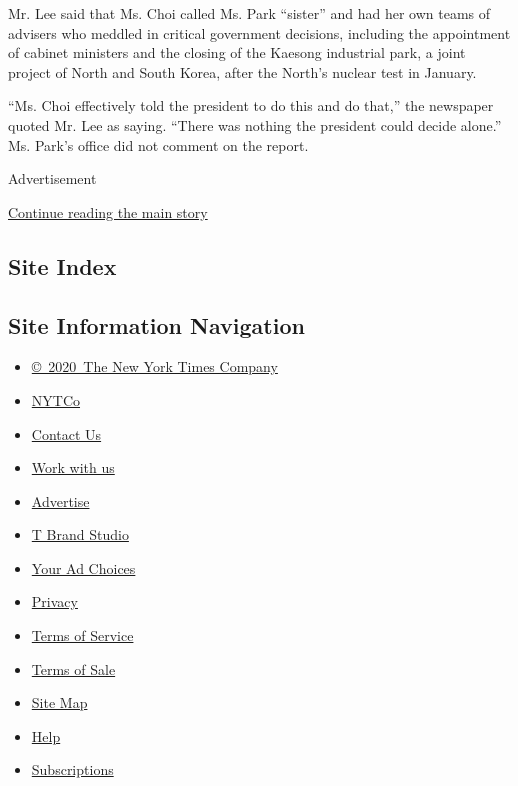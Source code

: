 Mr. Lee said that Ms. Choi called Ms. Park ``sister'' and had her own
teams of advisers who meddled in critical government decisions,
including the appointment of cabinet ministers and the closing of the
Kaesong industrial park, a joint project of North and South Korea, after
the North's nuclear test in January.

``Ms. Choi effectively told the president to do this and do that,'' the
newspaper quoted Mr. Lee as saying. ``There was nothing the president
could decide alone.'' Ms. Park's office did not comment on the report.

Advertisement

\protect\hyperlink{after-bottom}{Continue reading the main story}

\hypertarget{site-index}{%
\subsection{Site Index}\label{site-index}}

\hypertarget{site-information-navigation}{%
\subsection{Site Information
Navigation}\label{site-information-navigation}}

\begin{itemize}
\tightlist
\item
  \href{https://help.nytimes.com/hc/en-us/articles/115014792127-Copyright-notice}{©~2020~The
  New York Times Company}
\end{itemize}

\begin{itemize}
\tightlist
\item
  \href{https://www.nytco.com/}{NYTCo}
\item
  \href{https://help.nytimes.com/hc/en-us/articles/115015385887-Contact-Us}{Contact
  Us}
\item
  \href{https://www.nytco.com/careers/}{Work with us}
\item
  \href{https://nytmediakit.com/}{Advertise}
\item
  \href{http://www.tbrandstudio.com/}{T Brand Studio}
\item
  \href{https://www.nytimes.com/privacy/cookie-policy\#how-do-i-manage-trackers}{Your
  Ad Choices}
\item
  \href{https://www.nytimes.com/privacy}{Privacy}
\item
  \href{https://help.nytimes.com/hc/en-us/articles/115014893428-Terms-of-service}{Terms
  of Service}
\item
  \href{https://help.nytimes.com/hc/en-us/articles/115014893968-Terms-of-sale}{Terms
  of Sale}
\item
  \href{https://spiderbites.nytimes.com}{Site Map}
\item
  \href{https://help.nytimes.com/hc/en-us}{Help}
\item
  \href{https://www.nytimes.com/subscription?campaignId=37WXW}{Subscriptions}
\end{itemize}
